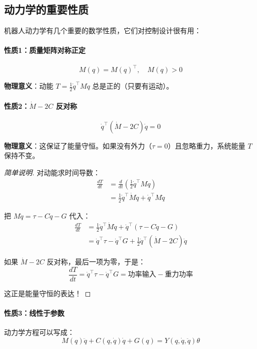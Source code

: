 \subsection{动力学的重要性质}

机器人动力学有几个重要的数学性质，它们对控制设计很有用：

\paragraph{性质1：质量矩阵对称正定}
\[
M(q) = M(q)^\top, \quad M(q) > 0
\]

\textbf{物理意义}：动能 $T = \frac{1}{2}\dot{q}^\top M \dot{q}$ 总是正的（只要有运动）。

\paragraph{性质2：$\dot{M} - 2C$ 反对称}
\[
\dot{q}^\top (\dot{M} - 2C) \dot{q} = 0
\]

\textbf{物理意义}：这保证了能量守恒。如果没有外力（$\tau = 0$）且忽略重力，系统能量 $T$ 保持不变。

\begin{proof}[简单说明]
对动能求时间导数：
\begin{align}
\frac{dT}{dt} &= \frac{d}{dt}\left(\frac{1}{2}\dot{q}^\top M \dot{q}\right) \\
&= \frac{1}{2}\dot{q}^\top \dot{M} \dot{q} + \dot{q}^\top M \ddot{q}
\end{align}

把 $M\ddot{q} = \tau - C\dot{q} - G$ 代入：
\begin{align}
\frac{dT}{dt} &= \frac{1}{2}\dot{q}^\top \dot{M} \dot{q} + \dot{q}^\top (\tau - C\dot{q} - G) \\
&= \dot{q}^\top \tau - \dot{q}^\top G + \frac{1}{2}\dot{q}^\top (\dot{M} - 2C) \dot{q}
\end{align}

如果 $\dot{M} - 2C$ 反对称，最后一项为零，于是：
\[
\frac{dT}{dt} = \dot{q}^\top \tau - \dot{q}^\top G = \text{功率输入} - \text{重力功率}
\]

这正是能量守恒的表达！
\end{proof}

\paragraph{性质3：线性于参数}

动力学方程可以写成：
\[
M(q)\ddot{q} + C(q,\dot{q})\dot{q} + G(q) = Y(q, \dot{q}, \ddot{q}) \theta
\]

